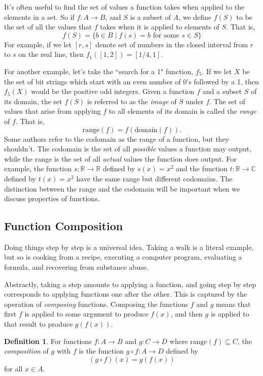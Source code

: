 \documentclass[11pt,oneside]{book}
\theoremstyle{definition}
\newtheorem{defn}[thm]{Definition}
\begin{document}
It's often useful to find the set of values a function takes when applied to the elements in a set.
So if $f: A \to B$, and $S$ is a subset of $A$, we define $f(S)$ to be the set of all the values that $f$ takes when it is applied to elements of $S$.
That is,
\[ f(S) = \{ b \in B \mid f(s) = b \text{ for some } s \in S \} \]
For example, if we let $[r, s]$ denote set of numbers in the closed interval from $r$ to $s$ on the real line, then $f_{1}([1, 2]) = [1/4, 1]$.

For another example, let's take the ``search for a 1" function, $f_{5}$.
If we let $X$ be the set of bit strings which start with an even number of 0's followed by a 1, then $f_{5}(X)$ would be the positive odd integers.
Given a function $f$ and a subset $S$ of its domain, the set $f(S)$ is referred to as the \emph{image} of $S$ under $f$.
The set of values that arise from applying $f$ to all elements of its domain is called the \emph{range} of $f$.
That is,
\[ \text{range}(f) = f(\text{domain}(f)). \]
Some authors refer to the codomain as the range of a function, but they shouldn't.
The codomain is the set of all \emph{possible} values a function may output, while the range is the set of all \emph{actual} values the function does output.
For example, the function $s: \mathbb{R} \to \mathbb{R}$ defined by $s(x) = x^{2}$ and the function $t: \mathbb{R} \to \mathbb{C}$ defined by $t(x) = x^{2}$ have the same range but different codomains.
The distinction between the range and the codomain will be important when we discuss properties of functions.


\subsection{Function Composition}
Doing things step by step is a universal idea.
Taking a walk is a literal example, but so is cooking from a recipe, executing a computer program, evaluating a formula, and recovering from substance abuse.

Abstractly, taking a step amounts to applying a function, and going step by step corresponds to applying functions one after the other.
This is captured by the operation of \emph{composing} functions.
Composing the functions $f$ and $g$ means that first $f$ is applied to some argument to produce $f(x)$, and then $g$ is applied to that result to produce $g(f(x))$.

\begin{defn}
    For functions $f: A \to B$ and $g: C \to D$ where $\text{range}(f) \subseteq C$, the \emph{composition} of $g$ with $f$ is the function $g \circ f: A \to D$ defined by
    \[ (g \circ f)(x) = g(f(x)) \]
    for all $x \in A$.
\end{defn}
\end{document}
